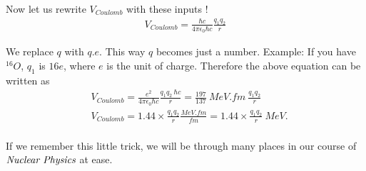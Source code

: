     Now let us rewrite $V_{Coulomb}$ with these inputs ! \\
    \begin{equation}
        \begin{split}
    V_{Coulomb} = \frac{\hbar c}{4 \pi \epsilon_0 \hbar c} \frac{q_1q_2}{r}
        \end{split}
    \end{equation}

    We replace $q$ with $q.e$. This way $q$ becomes just a number. Example: If you have $^{16}O$, $q_1$ is $16e$, where $e$ is the unit of charge. Therefore the above equation can be written as \\
    \begin{equation}
        \begin{split}
    &V_{Coulomb} = \frac{e^{2}}{4 \pi \epsilon_0 \hbar c} \frac{q_1q_2 \ \hbar c}{r} = \frac{197}{137} \ MeV. fm \ \frac{q_1q_2}{r} \\[12pt]
    &V_{Coulomb} = 1.44 × \frac{q_1q_2}{r} \frac{MeV.fm}{fm} = 1.44 × \frac{q_1q_2}{r} \ MeV. \\[12pt]
        \end{split}
    \end{equation}
    \par If we remember this little trick, we will be through many places in our course of $\emph{Nuclear Physics}$ at ease. \\[25pt]
    
\begin{comment}
    \begin{tcolorbox}
    [colframe=black!50!black,colback=white!100!white,arc=0.1em,fonttitle=\bfseries,title= \underline{Learning Outcomes:},width= \textwidth]
        \begin{itemize}
        \item $\textcolor{blue}{1 \ a.m.u. = 931.502 \ MeV}$
        \item \textcolor{blue}{Using the concept of fine structure constant and fermi length to handle numerical problems in \emph{Nuclear Physics} in a convient way. Example: Calculation of Coulomb Barrier between the colliding nuclei.}
        \end{itemize}
    \end{tcolorbox}
\end{comment}    
